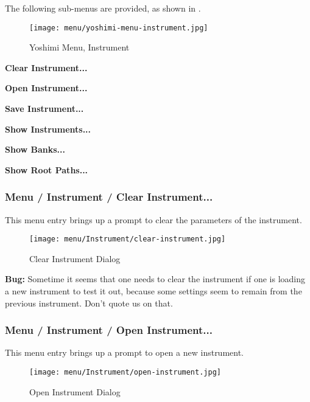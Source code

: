    The following sub-menus are provided, as shown in
   .

\begin{figure}[H]
   \centering 
   \texttt{[image: menu/yoshimi-menu-instrument.jpg]}
   \caption{Yoshimi Menu, Instrument}
   \label{fig:yoshimi_instrument_menu}
\end{figure}

   \begin{enumber}
      \item \textbf{Clear Instrument...}
      \item \textbf{Open Instrument...}
      \item \textbf{Save Instrument...}
      \item \textbf{Show Instruments...}
      \item \textbf{Show Banks...}
      \item \textbf{Show Root Paths...}
   \end{enumber}

\subsubsection{Menu / Instrument / Clear Instrument...}
\label{subsubsec:menu_instrument_clear}

This menu entry brings up a prompt to clear the parameters of the
instrument.

\begin{figure}[H]
   \centering 
   \texttt{[image: menu/Instrument/clear-instrument.jpg]}
   \caption{Clear Instrument Dialog}
   \label{fig:clear_instrument_dialog}
\end{figure}

   \textbf{Bug:}
   Sometime it seems that one needs to clear the instrument if one is
   loading a new instrument to test it out, because some settings seem
   to remain from the previous instrument.  Don't quote us on that.

\subsubsection{Menu / Instrument / Open Instrument...}
\label{subsubsec:menu_instrument_open}

This menu entry brings up a prompt to open a new instrument.

\begin{figure}[H]
   \centering 
   \texttt{[image: menu/Instrument/open-instrument.jpg]}
   \caption{Open Instrument Dialog}
   \label{fig:open_instrument_dialog}
\end{figure}

